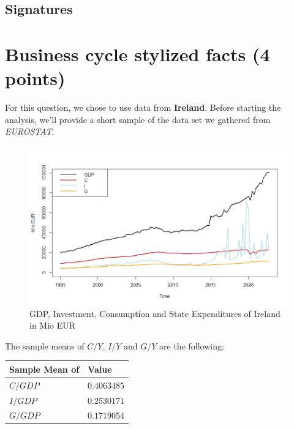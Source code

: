 \documentclass[a4paper,11pt]{article}
\begin{document}
\tableofcontents

\subsection{Signatures}
\pagebreak
\listoffigures
\pagebreak
\section{Business cycle stylized facts (4 points)}
For this question, we chose to use data from \textbf{Ireland}. Before starting the analysis, we'll provide a short sample of the data set we gathered from \textit{EUROSTAT}.

\begin{figure}[h]
    \centering
    \includegraphics[scale=0.7]{rawdataplot_ireland.png}
    \caption{GDP, Investment, Consumption and State Expenditures of Ireland in Mio EUR}
    \label{fig:rawdata}
\end{figure}

The sample means of $C/Y$, $I/Y$ and $G/Y$ are the following:
\begin{longtable}[c]{@{}ll@{}}
\toprule
Sample Mean of    & Value    \\* \midrule
\endfirsthead
\endhead
\bottomrule
\endfoot
\endlastfoot
$C/GDP$ & $0.4063485$\\
$I/GDP$ & $0.2530171$\\
$G/GDP$ & $0.1719054$ \\* \bottomrule
\end{longtable}
\end{document}
